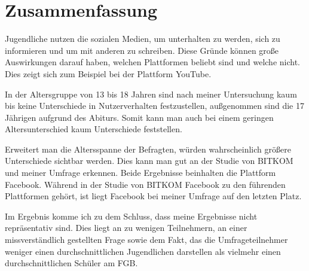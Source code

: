 \section{Zusammenfassung}

Jugendliche nutzen die sozialen Medien, um unterhalten zu werden, sich zu informieren und um mit anderen zu schreiben. Diese 
Gründe können große Auswirkungen darauf haben, welchen Plattformen beliebt sind und welche nicht. Dies zeigt sich zum Beispiel 
bei der Plattform YouTube.

In der Altersgruppe von 13 bis 18 Jahren sind nach meiner Untersuchung kaum bis keine Unterschiede in Nutzerverhalten festzustellen, 
außgenommen sind die 17 Jährigen aufgrund des Abiturs. Somit kann man auch bei einem geringen Altersunterschied kaum Unterschiede
feststellen.

Erweitert man die Altersspanne der Befragten, würden wahrscheinlich größere Unterschiede sichtbar werden. Dies kann man gut
an der Studie von BITKOM und meiner Umfrage erkennen. Beide Ergebnisse beinhalten die Plattform Facebook. Während in der 
Studie von BITKOM Facebook zu den führenden Plattformen gehört, ist liegt Facebook bei meiner Umfrage auf den letzten Platz.

Im Ergebnis komme ich zu dem Schluss, dass meine Ergebnisse nicht repräsentativ sind. Dies liegt an zu wenigen
Teilnehmern, an einer missverständlich gestellten Frage sowie dem Fakt, das die Umfrageteilnehmer weniger einen durchschnittlichen
Jugendlichen darstellen als vielmehr einen durchschnittlichen Schüler am FGB.